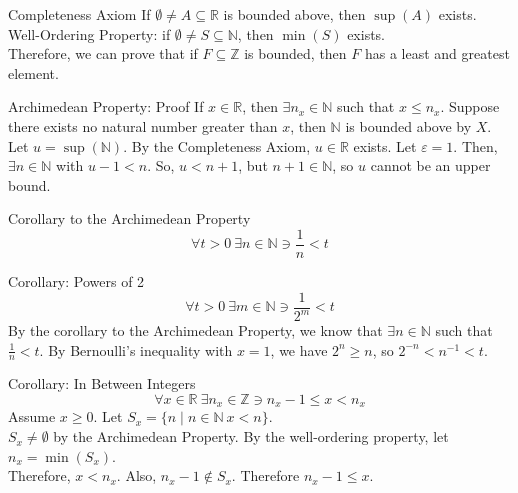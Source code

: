 \documentclass[10pt]{extarticle}
\newcommand{\N}{\mathbb{N}}
\newcommand{\Z}{\mathbb{Z}}
\newcommand{\R}{\mathbb{R}}
\begin{document}
  \begin{problem}{Completeness Axiom}
    If $\emptyset\neq A\subseteq \R$ is bounded above, then $\sup(A)$ exists.\\

    Well-Ordering Property: if $\emptyset \neq S\subseteq \N$, then $\min(S)$ exists.\\

    Therefore, we can prove that if $F\subseteq \Z$ is bounded, then $F$ has a least and greatest element.\\

    \begin{problem}{Archimedean Property: Proof}
      If $x\in\R$, then $\exists n_x\in\N$ such that $x\leq n_x$.
      \tcblower
      Suppose there exists no natural number greater than $x$, then $\N$ is bounded above by $X$. Let $u = \sup(\N)$. By the Completeness Axiom, $u\in\R$ exists. Let $\varepsilon = 1$. Then, $\exists n\in\N$ with $u-1 < n$. So, $u < n+1$, but $n+1\in\N$, so $u$ cannot be an upper bound.
    \end{problem}
    \begin{problem}{Corollary to the Archimedean Property}
      \[
        \forall t > 0~\exists n\in\N \ni \frac{1}{n}<t
      \] 
    \end{problem}
    \begin{problem}{Corollary: Powers of 2}
      \[
        \forall t > 0~\exists m\in\N \ni \frac{1}{2^m} < t
      \] 
      \tcblower
      By the corollary to the Archimedean Property, we know that $\exists n\in \N$ such that $\frac{1}{n} < t$. By Bernoulli's inequality with $x = 1$, we have $2^n \geq n$, so $2^{-n} < n^{-1} < t$.
    \end{problem}
    \begin{problem}{Corollary: In Between Integers}
      \[
        \forall x\in\R~\exists n_x\in \Z \ni n_x-1 \leq x < n_x
      \] 
      \tcblower
      Assume $x \geq 0$. Let $S_x = \{n\mid n\in \N~x < n\}$.\\

      $S_x \neq \emptyset$ by the Archimedean Property. By the well-ordering property, let $n_x = \min(S_x)$.\\

      Therefore, $x < n_x$. Also, $n_x - 1 \notin S_x$. Therefore $n_x - 1 \leq x$.
    \end{problem}
  \end{problem}
\end{document}
